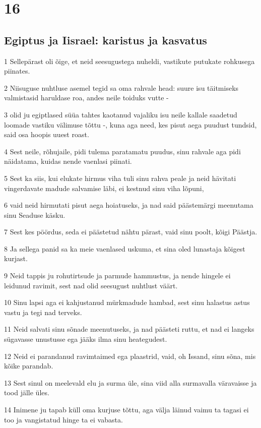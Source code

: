 \chapter{16} 

\section*{Egiptus ja Iisrael: karistus ja kasvatus}

\par 1 Sellepärast oli õige, et neid seesugustega nuheldi, vastikute putukate rohkusega piinates.
\par 2 Niisuguse nuhtluse asemel tegid sa oma rahvale head: suure isu täitmiseks valmistasid haruldase roa, andes neile toiduks vutte -
\par 3 olid ju egiptlased süüa tahtes kaotanud vajaliku isu neile kallale saadetud loomade vastiku välimuse tõttu -, kuna aga need, kes pisut aega puudust tundsid, said osa hoopis uuest roast.
\par 4 Sest neile, rõhujaile, pidi tulema paratamatu puudus, sinu rahvale aga pidi näidatama, kuidas nende vaenlasi piinati.
\par 5 Sest ka siis, kui elukate hirmus viha tuli sinu rahva peale ja neid hävitati vingerdavate madude salvamise läbi, ei kestnud sinu viha lõpuni,
\par 6 vaid neid hirmutati pisut aega hoiatuseks, ja nad said päästemärgi meenutama sinu Seaduse käsku.
\par 7 Sest kes pöördus, seda ei päästetud nähtu pärast, vaid sinu poolt, kõigi Päästja.
\par 8 Ja sellega panid sa ka meie vaenlased uskuma, et sina oled lunastaja kõigest kurjast.
\par 9 Neid tappis ju rohutirtsude ja parmude hammustus, ja nende hingele ei leidunud ravimit, sest nad olid seesugust nuhtlust väärt.
\par 10 Sinu lapsi aga ei kahjustanud mürkmadude hambad, sest sinu halastus astus vastu ja tegi nad terveks.
\par 11 Neid salvati sinu sõnade meenutuseks, ja nad päästeti ruttu, et nad ei langeks sügavasse unustusse ega jääks ilma sinu heategudest.
\par 12 Neid ei parandanud ravimtaimed ega plaastrid, vaid, oh Issand, sinu sõna, mis kõike parandab.
\par 13 Sest sinul on meelevald elu ja surma üle, sina viid alla surmavalla väravaisse ja tood jälle üles.
\par 14 Inimene ju tapab küll oma kurjuse tõttu, aga välja läinud vaimu ta tagasi ei too ja vangistatud hinge ta ei vabasta.
